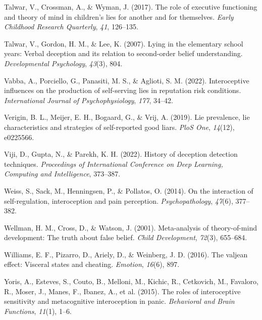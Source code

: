 \documentclass[
  man,mask,floatsintext]{apa6}
\newlength{\cslhangindent}
\newlength{\cslentryspacingunit} %
\newenvironment{CSLReferences}[2] %
 {%
  \setlength{\parindent}{0pt}
  \ifodd #1
  \let\oldpar\par
  \def\par{\hangindent=\cslhangindent\oldpar}
  \fi
  \setlength{\parskip}{#2\cslentryspacingunit}
 }%
 {}
\begin{document}
\begin{CSLReferences}{1}{0}
\leavevmode{}%
Talwar, V., Crossman, A., \& Wyman, J. (2017). The role of executive functioning and theory of mind in children's lies for another and for themselves. \emph{Early Childhood Research Quarterly}, \emph{41}, 126--135.

\leavevmode{}%
Talwar, V., Gordon, H. M., \& Lee, K. (2007). Lying in the elementary school years: Verbal deception and its relation to second-order belief understanding. \emph{Developmental Psychology}, \emph{43}(3), 804.

\leavevmode{}%
Vabba, A., Porciello, G., Panasiti, M. S., \& Aglioti, S. M. (2022). Interoceptive influences on the production of self-serving lies in reputation risk conditions. \emph{International Journal of Psychophysiology}, \emph{177}, 34--42.

\leavevmode{}%
Verigin, B. L., Meijer, E. H., Bogaard, G., \& Vrij, A. (2019). Lie prevalence, lie characteristics and strategies of self-reported good liars. \emph{PloS One}, \emph{14}(12), e0225566.

\leavevmode{}%
Viji, D., Gupta, N., \& Parekh, K. H. (2022). History of deception detection techniques. \emph{Proceedings of International Conference on Deep Learning, Computing and Intelligence}, 373--387.

\leavevmode{}%
Weiss, S., Sack, M., Henningsen, P., \& Pollatos, O. (2014). On the interaction of self-regulation, interoception and pain perception. \emph{Psychopathology}, \emph{47}(6), 377--382.

\leavevmode{}%
Wellman, H. M., Cross, D., \& Watson, J. (2001). Meta-analysis of theory-of-mind development: The truth about false belief. \emph{Child Development}, \emph{72}(3), 655--684.

\leavevmode{}%
Williams, E. F., Pizarro, D., Ariely, D., \& Weinberg, J. D. (2016). The valjean effect: Visceral states and cheating. \emph{Emotion}, \emph{16}(6), 897.

\leavevmode{}%
Yoris, A., Esteves, S., Couto, B., Melloni, M., Kichic, R., Cetkovich, M., Favaloro, R., Moser, J., Manes, F., Ibanez, A., et al. (2015). The roles of interoceptive sensitivity and metacognitive interoception in panic. \emph{Behavioral and Brain Functions}, \emph{11}(1), 1--6.

\end{CSLReferences}

\endgroup
\end{document}

